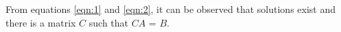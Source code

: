 \documentclass[journal,12pt,twocolumn]{IEEEtran}
\renewcommand\thesection{\arabic{section}}
\begin{document}
From equations \ref{eqn:1} and \ref{eqn:2}, it can be observed that solutions exist and there is a matrix $C$ such that $CA$ = $B$.
%
\end{document}
